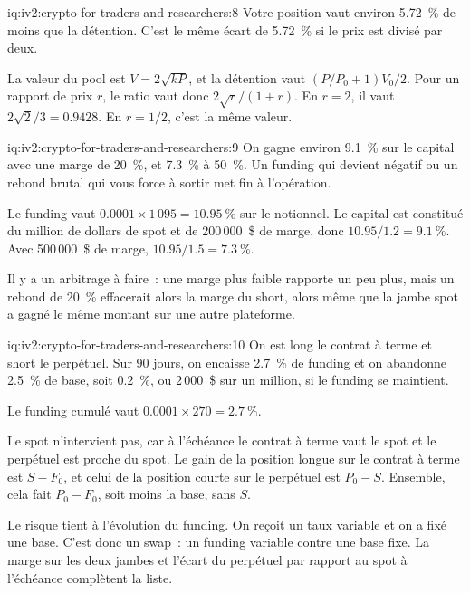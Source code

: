 \begin{solution}{iq:iv2:crypto-for-traders-and-researchers:8}
Votre position vaut environ 5.72~\% de moins que la détention. C'est le même écart de 5.72~\% si le prix est divisé par deux.

La valeur du pool est $V = 2\sqrt{kP}$, et la détention vaut $(P/P_0 + 1)V_0/2$. Pour un rapport de prix $r$, le ratio vaut donc $2\sqrt{r}/(1 + r)$. En $r = 2$, il vaut $2\sqrt{2}/3 = 0.9428$. En $r = 1/2$, c'est la même valeur.

\end{solution}

\begin{solution}{iq:iv2:crypto-for-traders-and-researchers:9}
On gagne environ 9.1~\% sur le capital avec une marge de 20~\%, et 7.3~\% à 50~\%. Un funding qui devient négatif ou un rebond brutal qui vous force à sortir met fin à l'opération.

Le funding vaut $0.0001 \times 1\,095 = 10.95~\%$ sur le notionnel. Le capital est constitué du million de dollars de spot et de 200\,000~\$ de marge, donc $10.95/1.2 = 9.1~\%$. Avec 500\,000~\$ de marge, $10.95/1.5 = 7.3~\%$.

Il y a un arbitrage à faire~: une marge plus faible rapporte un peu plus, mais un rebond de 20~\% effacerait alors la marge du short, alors même que la jambe spot a gagné le même montant sur une autre plateforme.

\end{solution}

\begin{solution}{iq:iv2:crypto-for-traders-and-researchers:10}
On est long le contrat à terme et short le perpétuel. Sur 90 jours, on encaisse 2.7~\% de funding et on abandonne 2.5~\% de base, soit 0.2~\%, ou 2\,000~\$ sur un million, si le funding se maintient.

Le funding cumulé vaut $0.0001 \times 270 = 2.7~\%$.

Le spot n'intervient pas, car à l'échéance le contrat à terme vaut le spot et le perpétuel est proche du spot. Le gain de la position longue sur le contrat à terme est $S - F_0$, et celui de la position courte sur le perpétuel est $P_0 - S$. Ensemble, cela fait $P_0 - F_0$, soit moins la base, sans $S$.

Le risque tient à l'évolution du funding. On reçoit un taux variable et on a fixé une base. C'est donc un swap~: un funding variable contre une base fixe. La marge sur les deux jambes et l'écart du perpétuel par rapport au spot à l'échéance complètent la liste.

\end{solution}

